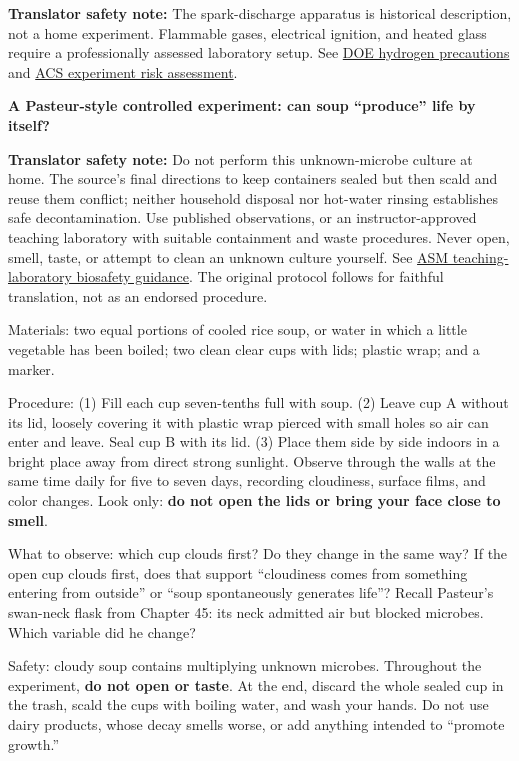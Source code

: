 \textbf{Translator safety note:} The spark-discharge apparatus is historical description, not a home experiment. Flammable gases, electrical ignition, and heated glass require a professionally assessed laboratory setup. See \href{https://www.energy.gov/cmei/fuels/safe-use-hydrogen}{DOE hydrogen precautions} and \href{https://institute.acs.org/acs-center/lab-safety/education-training/safer-experiments.html}{ACS experiment risk assessment}.

\begin{shiyan}
\textbf{A Pasteur-style controlled experiment: can soup ``produce'' life by itself?}

\textbf{Translator safety note:} Do not perform this unknown-microbe culture at home. The source's final directions to keep containers sealed but then scald and reuse them conflict; neither household disposal nor hot-water rinsing establishes safe decontamination. Use published observations, or an instructor-approved teaching laboratory with suitable containment and waste procedures. Never open, smell, taste, or attempt to clean an unknown culture yourself. See \href{https://asm.org/guideline/asm-guidelines-for-biosafety-in-teaching-laborator}{ASM teaching-laboratory biosafety guidance}. The original protocol follows for faithful translation, not as an endorsed procedure.

Materials: two equal portions of cooled rice soup, or water in which a little vegetable has been boiled; two clean clear cups with lids; plastic wrap; and a marker.

Procedure: (1) Fill each cup seven-tenths full with soup. (2) Leave cup A without its lid, loosely covering it with plastic wrap pierced with small holes so air can enter and leave. Seal cup B with its lid. (3) Place them side by side indoors in a bright place away from direct strong sunlight. Observe through the walls at the same time daily for five to seven days, recording cloudiness, surface films, and color changes. Look only: \textbf{do not open the lids or bring your face close to smell}.

What to observe: which cup clouds first? Do they change in the same way? If the open cup clouds first, does that support ``cloudiness comes from something entering from outside'' or ``soup spontaneously generates life''? Recall Pasteur's swan-neck flask from Chapter 45: its neck admitted air but blocked microbes. Which variable did he change?

Safety: cloudy soup contains multiplying unknown microbes. Throughout the experiment, \textbf{do not open or taste}. At the end, discard the whole sealed cup in the trash, scald the cups with boiling water, and wash your hands. Do not use dairy products, whose decay smells worse, or add anything intended to ``promote growth.''
\end{shiyan}


